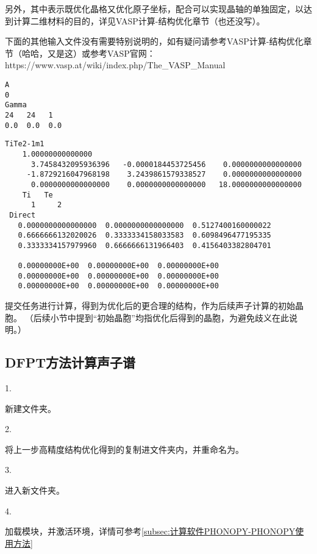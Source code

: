 另外，其中表示既优化晶格又优化原子坐标，配合可以实现晶轴的单独固定，以达到计算二维材料的目的，详见VASP计算-结构优化章节（也还没写）。

下面的其他输入文件没有需要特别说明的，如有疑问请参考VASP计算-结构优化章节（哈哈，又是这）或参考VASP官网：https://www.vasp.at/wiki/index.php/The\_VASP\_Manual

\begin{lstlisting}[caption=KPOINTS]
A
0
Gamma
24   24   1
0.0  0.0  0.0
\end{lstlisting}

\begin{lstlisting}[caption=POSCAR]
 TiTe2-1m1                               
    1.00000000000000     
      3.7458432095936396   -0.0000184453725456    0.0000000000000000
     -1.8729216047968198    3.2439861579338527    0.0000000000000000
      0.0000000000000000    0.0000000000000000   18.0000000000000000
    Ti   Te
      1     2
 Direct
   0.0000000000000000  0.0000000000000000  0.5127400160000022
   0.6666666132020026  0.3333334158033583  0.6098496477195335
   0.3333334157979960  0.6666666131966403  0.4156403382804701
  
   0.00000000E+00  0.00000000E+00  0.00000000E+00
   0.00000000E+00  0.00000000E+00  0.00000000E+00
   0.00000000E+00  0.00000000E+00  0.00000000E+00
\end{lstlisting}

提交任务进行计算，得到为优化后的更合理的结构，作为后续声子计算的初始晶胞。
（后续小节中提到“初始晶胞”均指优化后得到的晶胞，为避免歧义在此说明。）

 
\subsection{DFPT方法计算声子谱}\label{subsec:具体计算步骤-DFPT方法计算声子谱}

1.

新建文件夹。

2.

将上一步高精度结构优化得到的复制进文件夹内，并重命名为。

3.

进入新文件夹。

4.

加载模块，并激活环境，详情可参考\ref{subsec:计算软件PHONOPY-PHONOPY使用方法}

